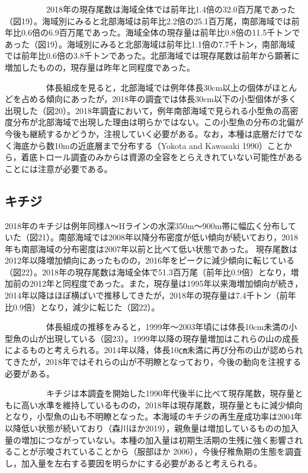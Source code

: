 \documentclass[11pt]{article} %
\begin{document}
\begin{linenumbers}
\ \ \ \ \ \ \ \ \ \ 
2018年の現存尾数は海域全体では前年比1.4倍の32.0百万尾であった（図19）。海域別にみると北部海域は前年比2.2倍の25.1百万尾，南部海域では前年比0.6倍の6.9百万尾であった。海域全体の現存量は前年比0.8倍の11.5千トンであった（図19）。海域別にみると北部海域は前年比1.1倍の7.7千トン，南部海域では前年比0.6倍の3.8千トンであった。北部海域では現存尾数は前年から顕著に増加したものの，現存量は昨年と同程度であった。

\ \ \ \ \ \ \ \ \ \ 
体長組成を見ると，北部海域では例年体長30cm以上の個体がほとんどを占める傾向にあったが，2018年の調査では体長30cm以下の小型個体が多く出現した（図20）。2018年調査において，例年南部海域で見られる小型魚の高密度分布が北部海域で出現した理由は明らかではない。この小型魚の分布の北偏が今後も継続するかどうか，注視していく必要がある。なお，本種は底層だけでなく海底から数10mの近底層まで分布する（Yokota and Kawasaki 1990）ことから，着底トロール調査のみからは資源の全容をとらえきれていない可能性があることには注意が必要である。

\subsection{キチジ}
2018年のキチジは例年同様A～Hラインの水深350m～900m帯に幅広く分布していた（図21）。南部海域では2008年以降分布密度が低い傾向が続いており，2018年も南部海域の分布密度は2007年以前と比べて低い状態であった。
現存尾数は2012年以降増加傾向にあったものの，2016年をピークに減少傾向に転じている（図22）。2018年の現存尾数は海域全体で51.3百万尾（前年比0.9倍）となり，増加前の2012年と同程度であった。また，現存量は1995年以来海増加傾向が続き，2014年以降はほぼ横ばいで推移してきたが，2018年の現存量は7.4千トン（前年比0.9倍）となり，減少に転じた（図22）。

\ \ \ \ \ \ \ \ \ \ 
体長組成の推移をみると，1999年～2003年頃には体長10cm未満の小型魚の山が出現している（図23）。1999年以降の現存量増加はこれらの山の成長によるものと考えられる。2014年以降，体長10㎝未満に再び分布の山が認められてきたが，2018年ではそれらの山が不明瞭となっており，今後の動向を注視する必要がある。

\ \ \ \ \ \ \ \ \ \ 
キチジは本調査を開始した1990年代後半に比べて現存尾数，現存量ともに高い水準を維持しているものの，2018年は現存尾数，現存量ともに減少傾向となり，小型魚の山も不明瞭となった。本海域のキチジの再生産成功率は2004年以降低い状態が続いており（森川ほか2019），親魚量は増加しているものの加入量の増加につながっていない。本種の加入量は初期生活期の生残に強く影響されることが示唆されていることから（服部ほか 2006），今後仔稚魚期の生態を調査し，加入量を左右する要因を明らかにする必要があると考えられる。


\end{linenumbers}
\end{document}
